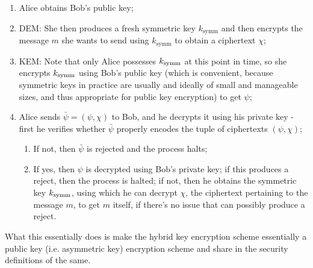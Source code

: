 \begin{enumerate}
\item Alice obtains Bob's public key;
\item \textsc{DEM}: She then produces a fresh symmetric key $k_\text{symm}$ and then encrypts the message $m$ she wants to send using $k_\text{symm}$ to obtain a ciphertext $\chi$;
\item \textsc{KEM}: Note that only Alice possesses $k_{\text{symm}}$ at this point in time, so she encrypts $k_{\text{symm}}$ using Bob's public key (which is convenient, because symmetric keys in practice are usually and ideally of small and manageable sizes, and thus appropriate for public key encryption) to get $\psi$;
\item Alice sends $\bar\psi=(\psi,\chi)$ to Bob, and he decrypts it using his private key - first he verifies whether $\bar\psi$ properly encodes the tuple of ciphertexts $(\psi,\chi)$;

\begin{enumerate}
\item If not, then $\bar\psi$ is rejected and the process halts;
\item If yes, then $\psi$ is decrypted using Bob's private key; if this produces a reject, then the process is halted; if not, then he obtains the symmetric key $k_{\text{symm}}$, using which he can decrypt $\chi$, the ciphertext pertaining to the message $m$, to get $m$ itself, if there's no issue that can possibly produce a reject.
\end{enumerate}

\end{enumerate}

What this essentially does is make the hybrid key encryption scheme essentially a public key (i.e. asymmetric key) encryption scheme and share in the security definitions of the same.
